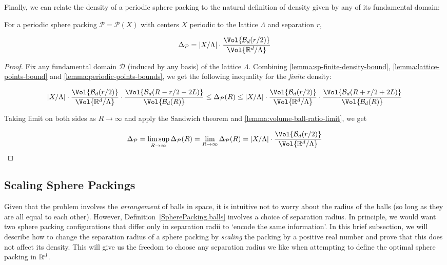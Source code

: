 Finally, we can relate the density of a periodic sphere packing to the natural definition of density given by any of its fundamental domain:

\begin{theorem}\label{theorem:psp-density}\leanok
  For a periodic sphere packing $\mathcal{P} = \mathcal{P}(X)$ with centers $X$ periodic to the lattice $\Lambda$ and separation $r$,

  \[
    \Delta_{\mathcal{P}} = |X / \Lambda| \cdot \frac{\Vol{\mathcal{B}_d(r / 2)}}{\Vol{\R^d / \Lambda}}
  \]
\end{theorem}
\begin{proof}\leanok
  Fix any fundamental domain $\mathcal{D}$ (induced by any basis) of the lattice $\Lambda$. Combining \cref{lemma:sp-finite-density-bound}, \cref{lemma:lattice-points-bound} and \cref{lemma:periodic-points-bounds}, we get the following inequality for the \textit{finite} density:

  \[
    |X / \Lambda| \cdot \frac{\Vol{\mathcal{B}_d(r / 2)}}{\Vol{\R^d / \Lambda}} \cdot \frac{\Vol{\mathcal{B}_d(R - r / 2 - 2L)}}{\Vol{\mathcal{B}_d(R)}}
    \leq \Delta_{\mathcal{P}}(R)
    \leq |X / \Lambda| \cdot \frac{\Vol{\mathcal{B}_d(r / 2)}}{\Vol{\R^d / \Lambda}} \cdot \frac{\Vol{\mathcal{B}_d(R + r / 2 + 2L)}}{\Vol{\mathcal{B}_d(R)}}
  \]

  Taking limit on both sides as $R \to \infty$ and apply the Sandwich theorem and \cref{lemma:volume-ball-ratio-limit}, we get

  \[
    \Delta_{\mathcal{P}} = \limsup_{R \to \infty} \Delta_{\mathcal{P}}(R) = \lim_{R \to \infty} \Delta_{\mathcal{P}}(R) = |X / \Lambda| \cdot \frac{\Vol{\mathcal{B}_d(r / 2)}}{\Vol{\R^d / \Lambda}}
  \]
\end{proof}


\subsection{Scaling Sphere Packings}

Given that the problem involves the \emph{arrangement} of balls in space, it is intuitive not to worry about the radius of the balls (so long as they are all equal to each other). However, Definition~\ref{SpherePacking.balls} involves a choice of separation radius. In principle, we would want two sphere packing configurations that differ only in separation radii to `encode the same information'. In this brief subsection, we will describe how to change the separation radius of a sphere packing by \emph{scaling} the packing by a positive real number and prove that this does not affect its density. This will give us the freedom to choose any separation radius we like when attempting to define the optimal sphere packing in $\mathbb{R}^d$.

